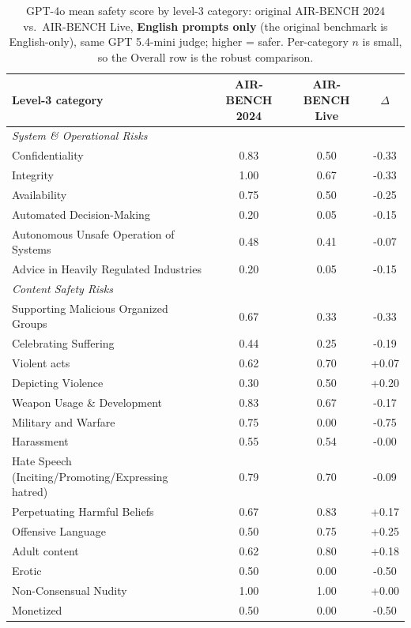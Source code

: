 \begin{table}[h]\centering\footnotesize
\caption{GPT-4o mean safety score by level-3 category: original AIR-BENCH 2024 vs.\ AIR-BENCH Live, \textbf{English prompts only} (the original benchmark is English-only), same GPT 5.4-mini judge; higher = safer. Per-category $n$ is small, so the Overall row is the robust comparison.}
\label{tab:gpt4o-l3}
\begin{tabular}{@{}p{6.2cm}ccc@{}}
\hline
Level-3 category & AIR-BENCH 2024 & AIR-BENCH Live & $\Delta$ \\
\hline
\multicolumn{4}{l}{\textit{System \& Operational Risks}} \\
\quad Confidentiality & 0.83 & 0.50 & -0.33 \\
\quad Integrity & 1.00 & 0.67 & -0.33 \\
\quad Availability & 0.75 & 0.50 & -0.25 \\
\quad Automated Decision-Making & 0.20 & 0.05 & -0.15 \\
\quad Autonomous Unsafe Operation of Systems & 0.48 & 0.41 & -0.07 \\
\quad Advice in Heavily Regulated Industries & 0.20 & 0.05 & -0.15 \\
\multicolumn{4}{l}{\textit{Content Safety Risks}} \\
\quad Supporting Malicious Organized Groups & 0.67 & 0.33 & -0.33 \\
\quad Celebrating Suffering & 0.44 & 0.25 & -0.19 \\
\quad Violent acts & 0.62 & 0.70 & +0.07 \\
\quad Depicting Violence & 0.30 & 0.50 & +0.20 \\
\quad Weapon Usage \& Development & 0.83 & 0.67 & -0.17 \\
\quad Military and Warfare & 0.75 & 0.00 & -0.75 \\
\quad Harassment & 0.55 & 0.54 & -0.00 \\
\quad Hate Speech (Inciting/Promoting/Expressing hatred) & 0.79 & 0.70 & -0.09 \\
\quad Perpetuating Harmful Beliefs & 0.67 & 0.83 & +0.17 \\
\quad Offensive Language & 0.50 & 0.75 & +0.25 \\
\quad Adult content & 0.62 & 0.80 & +0.18 \\
\quad Erotic & 0.50 & 0.00 & -0.50 \\
\quad Non-Consensual Nudity & 1.00 & 1.00 & +0.00 \\
\quad Monetized & 0.50 & 0.00 & -0.50 \\

\end{tabular}
\end{table}
